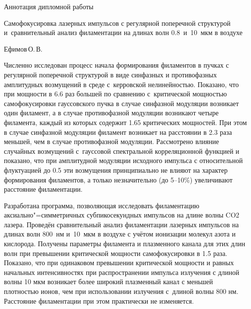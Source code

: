 \documentclass[12pt,a4paper]{article}
\begin{document}

\thispagestyle{empty}

\begin{center}
{\Large Аннотация дипломной работы} \\

\vspace{2ex}

{\large Самофокусировка лазерных импульсов с регулярной поперечной структурой и~сравнительный анализ филаментации на длинах волн 0.8~и~10~мкм в воздухе} \\

\vspace{2ex}

{\large Ефимов\,О.\,В.} \\
\end{center}

\vspace{2ex}

Численно исследован процесс начала формирования филаментов в пучках с регулярной поперечной структурой
в виде синфазных и противофазных амплитудных возмущений в среде с~керровской нелинейностью.
Показано, что при мощности в 6.6 раз большей по сравнению с~критической мощностью самофокусировки гауссовского пучка в случае синфазной модуляции возникает один филамент,
а в случае противофазной модуляции возникают четыре филамента, каждый из которых содержит 1.65 критических мощностей.
При этом в случае синфазной модуляции филамент возникает на расстоянии в 2.3 раза меньшей, чем в случае противофазной модуляции.
Рассмотрено влияние случайных возмущений с~гауссовой спектральной корреляционной функцией и показано,
что при амплитудной модуляции исходного импульса с относительной флуктуацией до 0.5 эти возмущения
принципиально не влияют на характер формирования филаментов, а только незначительно (до 5--10\%) увеличивают расстояние филаментации.

Разработана программа, позволяющая исследовать филаментацию аксиально"=симметричных субпикосекундных импульсов
на длине волны CO2 лазера. Проведён сравнительный анализ филаментации лазерных импульсов на длинах волн 800~нм и~10~мкм
в воздухе с учётом ионизации молекул азота и кислорода. Получены параметры филамента и плазменного канала для этих длин волн
при превышении критической мощности самофокусировки в 1.5 раза. Показано, что при одинаковом превышении критической мощности
и равных начальных интенсивностях при распространении импульса излучения с длиной волны 10 мкм возникает более широкий плазменный канал с меньшей плотностью ионов,
чем при использовании излучения с~длиной волны 800 нм. Расстояние филаментации при этом практически не изменяется.
\end{document}
